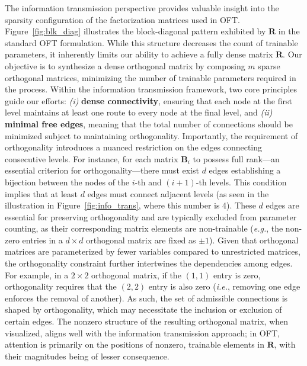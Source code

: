 The information transmission perspective provides valuable insight into the sparsity configuration of the factorization matrices used in OFT. Figure~\ref{fig:blk_diag} illustrates the block-diagonal pattern exhibited by $\bm{R}$ in the standard OFT formulation. While this structure decreases the count of trainable parameters, it inherently limits our ability to achieve a fully dense matrix $\bm{R}$. Our objective is to synthesize a dense orthogonal matrix by composing $m$ sparse orthogonal matrices, minimizing the number of trainable parameters required in the process. Within the information transmission framework, two core principles guide our efforts: \emph{(i)} \textbf{dense connectivity}, ensuring that each node at the first level maintains at least one route to every node at the final level, and \emph{(ii)} \textbf{minimal free edges}, meaning that the total number of connections should be minimized subject to maintaining orthogonality. Importantly, the requirement of orthogonality introduces a nuanced restriction on the edges connecting consecutive levels. For instance, for each matrix $\bm{B}_i$ to possess full rank—an essential criterion for orthogonality—there must exist $d$ edges establishing a bijection between the nodes of the $i$-th and $(i+1)$-th levels. This condition implies that at least $d$ edges must connect adjacent levels (as seen in the illustration in Figure~\ref{fig:info_trans}, where this number is 4). These $d$ edges are essential for preserving orthogonality and are typically excluded from parameter counting, as their corresponding matrix elements are non-trainable (\emph{e.g.}, the non-zero entries in a $d\times d$ orthogonal matrix are fixed as $\pm 1$). Given that orthogonal matrices are parameterized by fewer variables compared to unrestricted matrices, the orthogonality constraint further intertwines the dependencies among edges. For example, in a $2\times 2$ orthogonal matrix, if the $(1,1)$ entry is zero, orthogonality requires that the $(2,2)$ entry is also zero (\emph{i.e.}, removing one edge enforces the removal of another). As such, the set of admissible connections is shaped by orthogonality, which may necessitate the inclusion or exclusion of certain edges. The nonzero structure of the resulting orthogonal matrix, when visualized, aligns well with the information transmission approach; in OFT, attention is primarily on the positions of nonzero, trainable elements in $\bm{R}$, with their magnitudes being of lesser consequence.

